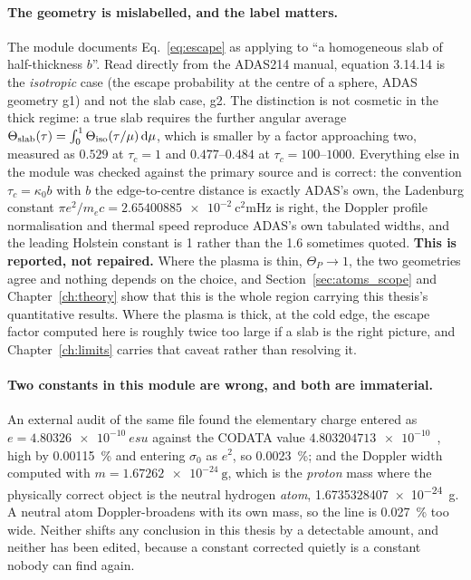 \paragraph{The geometry is mislabelled, and the label matters.} The module
documents Eq.~\eqref{eq:escape} as applying to ``a homogeneous slab of
half-thickness $b$''. Read directly from the ADAS214 manual, equation 3.14.14 is
the \emph{isotropic} case (the escape probability at the centre of a sphere,
ADAS geometry g1) and not the slab case, g2. The distinction is not cosmetic
in the thick regime: a true slab requires the further angular average
$\Theta_{\rm slab}(\tau) = \int_0^1 \Theta_{\rm iso}(\tau/\mu)\,\mathrm{d}\mu$,
which is smaller by a factor approaching two, measured as $0.529$ at
$\tau_c = 1$ and $0.477$--$0.484$ at $\tau_c = 100$--$1000$. Everything else in
the module was checked against the primary source and is correct: the convention
$\tau_c = \kappa_0 b$ with $b$ the edge-to-centre distance is exactly ADAS's own,
the Ladenburg constant $\pi e^{2}/m_ec = \SI{2.65400885e-2}{\square\centi\metre\hertz}$
is right, the Doppler profile normalisation and thermal speed reproduce ADAS's
own tabulated widths, and the leading Holstein constant is 1 rather than the
1.6 sometimes quoted. \textbf{This is reported, not repaired.} Where the plasma
is thin, $\Theta_P \to 1$, the two geometries agree and nothing depends on the
choice, and Section~\ref{sec:atoms_scope} and Chapter~\ref{ch:theory} show that
this is the whole region carrying this thesis's quantitative results. Where the plasma
is thick, at the cold edge, the escape factor computed here is roughly twice too
large if a slab is the right picture, and Chapter~\ref{ch:limits} carries that
caveat rather than resolving it.

\paragraph{Two constants in this module are wrong, and both are immaterial.}
An external audit of the same file found the elementary charge entered as
$e = \SI{4.80326e-10}{esu}$ against the CODATA value
$\num{4.803204713e-10}$~\cite{CODATA2018}, high by \SI{0.00115}{\percent} and
entering $\sigma_0$ as $e^{2}$, so \SI{0.0023}{\percent}; and the Doppler width
computed with $m = \SI{1.67262e-24}{\gram}$, which is the \emph{proton} mass
where the physically correct object is the neutral hydrogen \emph{atom},
\SI{1.6735328407e-24}{\gram}. A neutral atom Doppler-broadens with its own mass,
so the line is \SI{0.027}{\percent} too wide. Neither shifts any conclusion in
this thesis by a detectable amount, and neither has been edited, because a
constant corrected quietly is a constant nobody can find again.

